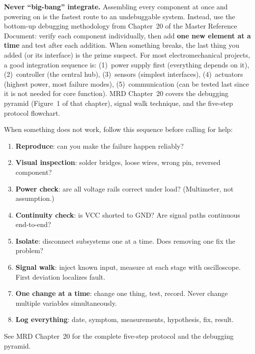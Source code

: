 \begin{warnbox}
\textbf{Never ``big-bang'' integrate.} Assembling every component at once and powering on is the fastest route to an undebuggable system. Instead, use the bottom-up debugging methodology from Chapter~20 of the Master Reference Document: verify each component individually, then add \textbf{one new element at a time} and test after each addition. When something breaks, the last thing you added (or its interface) is the prime suspect. For most electromechanical projects, a good integration sequence is: (1)~power supply first (everything depends on it), (2)~controller (the central hub), (3)~sensors (simplest interfaces), (4)~actuators (highest power, most failure modes), (5)~communication (can be tested last since it is not needed for core function). MRD Chapter~20 covers the debugging pyramid (Figure~1 of that chapter), signal walk technique, and the five-step protocol flowchart.
\end{warnbox}

\begin{checklistbox}
When something does not work, follow this sequence before calling for help:
\begin{enumerate}[leftmargin=*, itemsep=1pt, topsep=0pt]
    \item \textbf{Reproduce}: can you make the failure happen reliably?
    \item \textbf{Visual inspection}: solder bridges, loose wires, wrong pin, reversed component?
    \item \textbf{Power check}: are all voltage rails correct under load? (Multimeter, not assumption.)
    \item \textbf{Continuity check}: is VCC shorted to GND? Are signal paths continuous end-to-end?
    \item \textbf{Isolate}: disconnect subsystems one at a time. Does removing one fix the problem?
    \item \textbf{Signal walk}: inject known input, measure at each stage with oscilloscope. First deviation localizes fault.
    \item \textbf{One change at a time}: change one thing, test, record. Never change multiple variables simultaneously.
    \item \textbf{Log everything}: date, symptom, measurements, hypothesis, fix, result.
\end{enumerate}
See MRD Chapter~20 for the complete five-step protocol and the debugging pyramid.
\end{checklistbox}

